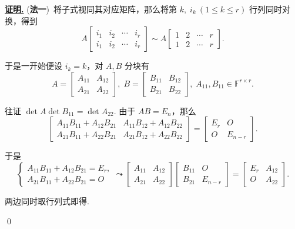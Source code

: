 \documentclass[10pt,openany]{article}
\theoremstyle{thmstyle} %
\theoremstyle{defstyle} %
\theoremstyle{prostyle} %
\theoremstyle{exastyle}
\theoremstyle{remstyle}
\renewenvironment{proof}[1][证明]{\par\underline{\textbf{#1.}} \;\fangsong}{\qed\par}
\newcommand{\F}{\mathbb{F}}
\begin{document}
\begin{proof}
	(\textbf{法一})\ 将子式视同其对应矩阵，那么将第 \( k, \; i_k \ (1 \leq k \leq r) \) 行列同时对换，得到
	\[ A \begin{bmatrix}
		i_1 & i_2 & \cdots & i_r \\
		i_1 & i_2 & \cdots & i_r
	\end{bmatrix} \sim A\begin{bmatrix}
	1 & 2 & \cdots & r \\
	1 & 2 & \cdots & r
	\end{bmatrix}. \]
	
	于是一开始便设 \( i_k=k \)，对 \( A,B \) 分块有
	\[ A=\begin{bmatrix}
		A_{11} & A_{12} \\
		A_{21} & A_{22}
	\end{bmatrix}, \; B=\begin{bmatrix}
	   B_{11} & B_{12} \\
	   B_{21} & B_{22}
	\end{bmatrix}, \; A_{11}, B_{11} \in \F^{r \times r}. \]
	
	往证 \( \det A \det B_{11}= \det A_{22} \). 由于 \( AB=E_n \)，那么
	\[ \begin{bmatrix}
		A_{11}B_{11}+A_{12}B_{21} & A_{11}B_{12}+A_{12}B_{22} \\
		A_{21}B_{11}+A_{22}B_{21} & A_{21}B_{12}+A_{22}B_{22}
	\end{bmatrix}=\begin{bmatrix}
	   E_r & O \\
	   O & E_{n-r}
	\end{bmatrix}. \]
	
	于是
	\[ \left\{ \begin{array}{l}
		A_{11}B_{11}+A_{12}B_{21}=E_r, \\
		A_{21}B_{11}+A_{22}B_{21}=O
	\end{array}\right. \leadsto \begin{bmatrix}
	A_{11} & A_{12} \\
	A_{21} & A_{22}
	\end{bmatrix}\begin{bmatrix}
	   B_{11} & O \\
	   B_{21} & E_{n-r}
	\end{bmatrix}=\begin{bmatrix}
	E_{r} & A_{12} \\
	O & A_{22}
	\end{bmatrix}. \]
	
	两边同时取行列式即得.
	

\end{proof}
\end{document}
